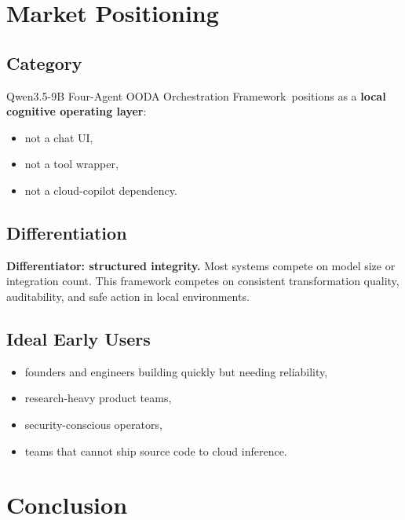 \documentclass[11pt]{article}
\newcommand{\FrameworkName}{Qwen3.5-9B Four-Agent OODA Orchestration Framework}
\begin{document}
\section{Market Positioning}

\subsection{Category}

\FrameworkName\ positions as a \textbf{local cognitive operating layer}:
\begin{itemize}
  \item not a chat UI,
  \item not a tool wrapper,
  \item not a cloud-copilot dependency.
\end{itemize}

\subsection{Differentiation}

\begin{InvestorBox}
\textbf{Differentiator: structured integrity.} Most systems compete on model size or integration count. This framework competes on consistent transformation quality, auditability, and safe action in local environments.
\end{InvestorBox}

\subsection{Ideal Early Users}

\begin{itemize}
  \item founders and engineers building quickly but needing reliability,
  \item research-heavy product teams,
  \item security-conscious operators,
  \item teams that cannot ship source code to cloud inference.
\end{itemize}

\section{Conclusion}
\end{document}
